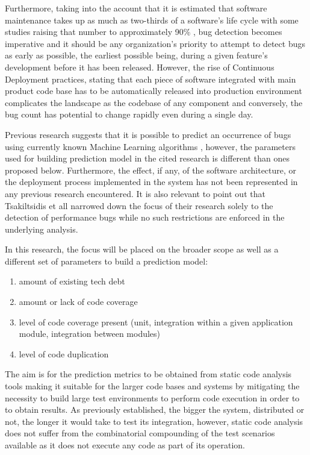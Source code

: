 Furthermore, taking into the account that it is estimated that software maintenance takes up as much as two-thirds of a software's life cycle \cite{duplicateBugDetection} with some studies raising that number to approximately 90\% \cite{reopenedBugsAndMaintenence}, bug detection becomes imperative and it should be any organization's priority to attempt to detect bugs as early as possible, the earliest possible being, during a given feature's development before it has been released. However, the rise of Continuous Deployment practices, stating that each piece of software integrated with main product code base has to be automatically released into production environment complicates the landscape as the codebase of any component and conversely, the bug count has potential to change rapidly even during a single day.

Previous research suggests that it is possible to predict an occurrence of bugs using currently known Machine Learning algorithms \cite{autoDetectionOfPerfBugs}, however, the parameters used for building prediction model in the cited research is different than ones proposed below. Furthermore, the effect, if any, of the software architecture, or the deployment process implemented in the system has not been represented in any previous research encountered. It is also relevant to point out that Tsakiltsidis et all \cite{autoDetectionOfPerfBugs} narrowed down the focus of their research solely to the detection of performance bugs while no such restrictions are enforced in the underlying analysis.

In this research, the focus will be placed on the broader scope as well as a different set of parameters to build a prediction model: 
\begin{enumerate}
\item amount of existing tech debt
\item amount or lack of code coverage
\item level of code coverage present (unit, integration within a given application module, integration between modules)
\item level of code duplication
\end{enumerate}
The aim is for the prediction metrics to be obtained from static code analysis tools making it suitable for the larger code bases and systems by mitigating the necessity to build large test environments to perform code execution in order to to obtain results. As previously established, the bigger the system, distributed or not, the longer it would take to test its integration, however, static code analysis does not suffer from the combinatorial compounding of the test scenarios available as it does not execute any code as part of its operation.

